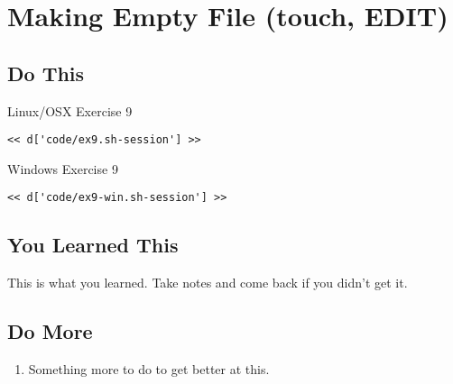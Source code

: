 \chapter{Making Empty File (touch, EDIT)}

\section{Do This}

\begin{code}{Linux/OSX Exercise 9}
\begin{Verbatim}
<< d['code/ex9.sh-session'] >>
\end{Verbatim}
\end{code}

\begin{code}{Windows Exercise 9}
\begin{Verbatim}
<< d['code/ex9-win.sh-session'] >>
\end{Verbatim}
\end{code}

\section{You Learned This}

This is what you learned.  Take notes and come back if you didn't get it.

\section{Do More}

\begin{enumerate}
\item Something more to do to get better at this.
\end{enumerate}

